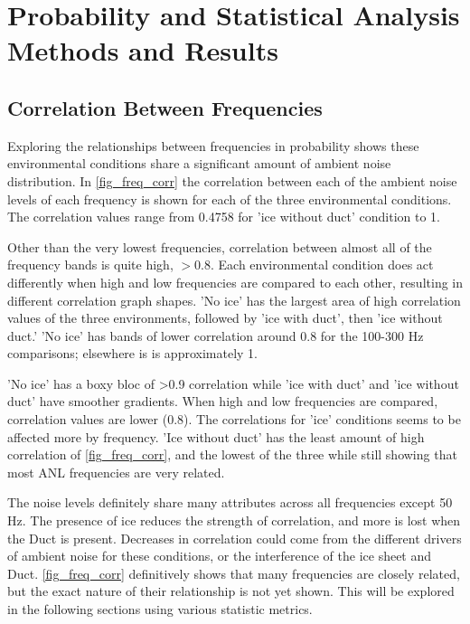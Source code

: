 \section{Probability and Statistical Analysis Methods and Results}

\subsection{Correlation Between Frequencies} \label{sec_corr_freq}

Exploring the relationships between frequencies in probability shows these environmental conditions share a significant amount of ambient noise distribution. In \autoref{fig_freq_corr} the correlation between each of the ambient noise levels of each frequency is shown for each of the three environmental conditions. The correlation values range from 0.4758 for 'ice without duct' condition to 1. 

Other than the very lowest frequencies, correlation between almost all of the frequency bands is quite high, $>0.8$.  Each environmental condition does act differently when high and low frequencies are compared to each other, resulting in different correlation graph shapes. 'No ice' has the largest area of high correlation values of the three environments, followed by 'ice with duct', then 'ice without duct.' 'No ice' has bands of lower correlation around 0.8 for the 100-300 Hz comparisons; elsewhere is is approximately 1.

'No ice' has a boxy bloc of >0.9 correlation while 'ice with duct' and 'ice without duct' have smoother gradients. When high and low frequencies are compared, correlation values are lower (0.8). The correlations for 'ice' conditions seems to be affected more by frequency. 'Ice without duct' has the least amount of high correlation of \autoref{fig_freq_corr}, and the lowest of the three while still showing that most ANL frequencies are very related.

The noise levels definitely share many attributes across all frequencies except 50 Hz. The presence of ice reduces the strength of correlation, and more is lost when the Duct is present. Decreases in correlation could come from the different drivers of ambient noise for these conditions, or the interference of the ice sheet and Duct. \autoref{fig_freq_corr} definitively shows that many frequencies are closely related, but the exact nature of their relationship is not yet shown. This will be explored in the following sections using various statistic metrics. 

